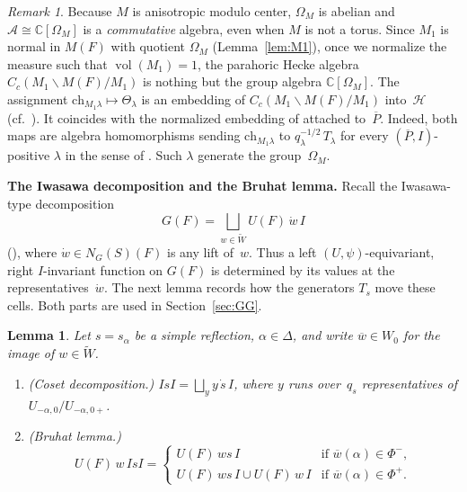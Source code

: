 \documentclass[11pt]{amsart}
\newtheorem{lemma}[theorem]{Lemma}
\theoremstyle{definition}
\theoremstyle{remark}
\newtheorem{remark}[theorem]{Remark}
\DeclareMathOperator{\vol}{vol}
\newcommand{\CC}{\mathbb{C}}
\newcommand{\HH}{\mathcal{H}}
\newcommand{\AAA}{\mathcal{A}}
\newcommand{\barr}[1]{\overline{#1}}
\begin{document}
\begin{remark}\label{rem:comm}
Because $M$ is anisotropic modulo center, $\Omega_M$ is abelian and $\AAA \cong \CC[\Omega_M]$ is a \emph{commutative} algebra, even when $M$ is not a torus. Since $M_1$ is normal in $M(F)$ with quotient $\Omega_M$ (Lemma~\ref{lem:M1}), once we normalize the measure such that $\vol(M_1) = 1$, the parahoric Hecke algebra $C_c(M_1\backslash M(F)/M_1)$ is nothing but the group algebra $\CC[\Omega_M]$. The assignment $\mathrm{ch}_{M_1\lambda} \mapsto \Theta_\lambda$ is an embedding of $C_c(M_1\backslash M(F)/M_1)$ into~$\HH$ (cf.\ \cite[\S 3]{Bushnell01}). It coincides with the normalized embedding of \cite[Rem.~6]{Bushnell01} attached to~$\barr{P}$. Indeed, both maps are algebra homomorphisms sending $\mathrm{ch}_{M_1\lambda}$ to $q_\lambda^{-1/2}\,T_\lambda$ for every $(\barr{P},I)$-positive $\lambda$ in the sense of \cite[\S 3.1]{Bushnell01}. Such $\lambda$ generate the group~$\Omega_M$.
\end{remark}

\medskip
\noindent\textbf{The Iwasawa decomposition and the Bruhat lemma.} Recall the Iwasawa-type decomposition
\begin{equation}\label{eq:iwasawa}
G(F) = \bigsqcup_{w\in\widetilde{W}} U(F)\,\dot{w}\,I
\end{equation}
(\cite[Thms.~5.3.3, 7.8.1]{KP}), where $\dot{w}\in N_G(S)(F)$ is any lift of~$w$. Thus a left $(U,\psi)$-equivariant, right $I$-invariant function on $G(F)$ is determined by its values at the representatives~$\dot{w}$. The next lemma records how the generators $T_s$ move these cells. Both parts are used in Section~\ref{sec:GG}.

\begin{lemma}\label{lem:bruhat}
Let $s = s_\alpha$ be a simple reflection, $\alpha\in\Delta$, and write $\barr{w}\in W_0$ for the image of $w\in\widetilde{W}$.
\begin{enumerate}[\upshape(1)]
\item \textup{(Coset decomposition.)} $\displaystyle I s I = \bigsqcup_{y} y\,\dot{s}\,I$, where $y$ runs over~$q_s$ representatives of $U_{-\alpha,0}/U_{-\alpha,0+}$.
\item \textup{(Bruhat lemma.)}
\[
U(F)\,w\,IsI = \begin{cases}
U(F)\,ws\,I & \text{if } \barr{w}(\alpha) \in \Phi^-,\\
U(F)\,ws\,I \cup U(F)\,w\,I & \text{if } \barr{w}(\alpha) \in \Phi^+.
\end{cases}
\]
\end{enumerate}
\end{lemma}
\end{document}
